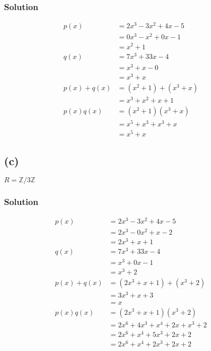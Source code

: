 \documentclass[fleqn]{article}
\begin{document}
            \subsubsection{Solution}
            \begin{align}
                p(x) &= 2x^3 - 3x^2 + 4x - 5 \\
                    &= 0x^3 - x^2 + 0x - 1 \\
                    &= x^2 + 1 \\
                q(x) &= 7x^3 + 33x - 4 \\
                    &= x^3 + x - 0 \\
                    &= x^3 + x \\
                p(x) + q(x) &= (x^2 + 1) + (x^3 + x) \\
                    &= x^3 + x^2 + x + 1 \\
                p(x)q(x) &= (x^2 + 1)(x^3 + x) \\
                    &= x^5 + x^3 + x^3 + x \\
                    &= x^5 + x
            \end{align}
        
        \subsection{(c)}
        $R = \mathbb{Z}/3\mathbb{Z}$
        
            \subsubsection{Solution}
            \begin{align}
                p(x) &= 2x^3 - 3x^2 + 4x - 5 \\
                    &= 2x^3 - 0x^2 + x - 2 \\
                    &= 2x^3 + x + 1 \\
                q(x) &= 7x^3 + 33x - 4 \\
                    &= x^3 + 0x - 1 \\
                    &= x^3 + 2 \\
                p(x) + q(x) &= (2x^3 + x + 1) + (x^3 + 2) \\
                    &= 3x^3 + x + 3 \\
                    &= x \\
                p(x)q(x) &= (2x^3 + x + 1)(x^3 + 2) \\
                    &= 2x^6 + 4x^3 + x^4 + 2x + x^3 + 2 \\
                    &= 2x^6 + x^4 + 5x^3 + 2x + 2 \\
                    &= 2x^6 + x^4 + 2x^3 + 2x + 2
            \end{align}
    
\end{document}
